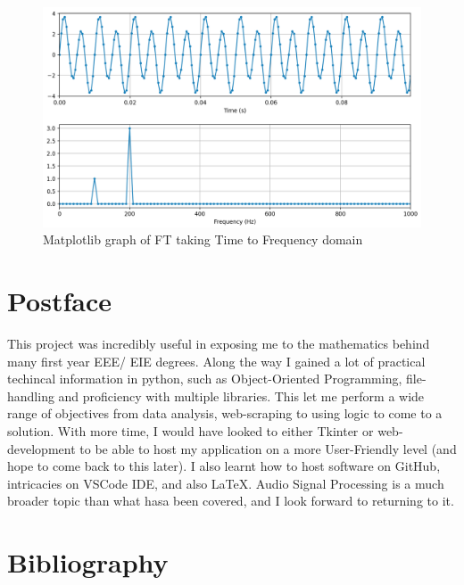 \documentclass[a4paper,12pt]{article}
\begin{document}







\newpage
\begin{figure}[h!]
    \centering
    \includegraphics[width=16cm]{FourierTransform Demo.png}
    \caption{Matplotlib graph of FT taking Time to Frequency domain \parencite{GitHubRepo}}
\end{figure}

\section{Postface}
\normalsize
This project was incredibly useful in exposing me to the mathematics behind many first year EEE/ EIE degrees. Along the way I gained a lot of practical techincal information in python,
such as Object-Oriented Programming, file-handling and proficiency with multiple libraries. This let me perform a wide range of objectives from data analysis, web-scraping to using logic to come to a solution.
With more time, I would have looked to either Tkinter or web-development to be able to host my application on a more User-Friendly level (and hope to come back to this later). 
I also learnt how to host software on GitHub, intricacies on VSCode IDE, and also LaTeX. Audio Signal Processing is a much broader topic than what hasa been covered, and I look forward to returning to it.

\newpage
\section{Bibliography}
\doublespacing
\printbibliography[heading = none]
\end{document}
